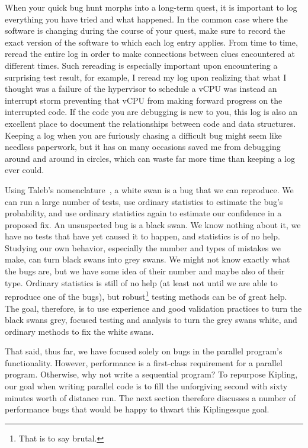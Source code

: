 When your quick bug hunt morphs into a long-term quest, it is important
to log everything you have tried and what happened.
In the common case where the software is changing during the course of
your quest, make sure to record the exact version of the software to
which each log entry applies.
From time to time, reread the entire log in order to make connections
between clues encountered at different times.
Such rereading is especially important upon encountering a surprising
test result, for example, I reread my log upon realizing that what I
thought was a failure of the hypervisor to schedule a vCPU was instead
an interrupt storm preventing that vCPU from making forward progress
on the interrupted code.
If the code you are debugging is new to you, this log is also an
excellent place to document the relationships between code and data
structures.
Keeping a log when you are furiously chasing a difficult bug might seem
like needless paperwork, but it has on many occasions saved me from
debugging around and around in circles, which can waste far more time
than keeping a log ever could.

Using Taleb's nomenclature~\cite{NassimTaleb2007BlackSwan},
a white swan is a bug that we can reproduce.
We can run a large number of tests, use ordinary statistics to
estimate the bug's probability, and use ordinary statistics again
to estimate our confidence in a proposed fix.
An unsuspected bug is a black swan.
We know nothing about it, we have no tests that have yet caused it
to happen, and statistics is of no help.
Studying our own behavior, especially the number and types of mistakes
we make, can turn black swans into grey swans.
We might not know exactly what the bugs are, but we have some idea of
their number and maybe also of their type.
Ordinary statistics is still of no help (at least not until we are
able to reproduce one of the bugs), but robust\footnote{
	That is to say brutal.}
testing methods can be of great help.
The goal, therefore, is to use experience and good validation practices
to turn the black swans grey, focused testing and analysis to turn the
grey swans white, and ordinary methods to fix the white swans.

That said, thus far, we have focused solely on bugs in the parallel program's
functionality.
However, performance is a first-class requirement for a parallel program.
Otherwise, why not write a sequential program?
To repurpose Kipling, our goal when writing parallel code is to fill
the unforgiving second with sixty minutes worth of distance run.
The next section therefore discusses a number of performance bugs that
would be happy to thwart this Kiplingesque goal.

